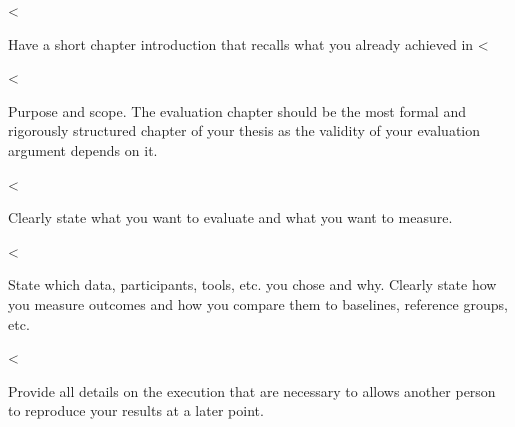 \documentclass[runningheads,a4paper,english]{llncs}[2018/03/10]
\begin{document}
{%
<%

Have a short chapter introduction that recalls what you already achieved in <%

<%

\textsf{Purpose and scope}. The evaluation chapter should be the most formal and rigorously structured chapter of your thesis as the validity of your evaluation argument depends on it.

<%

Clearly state what you want to evaluate and what you want to measure.

<%

State which data, participants, tools, etc. you chose and why. Clearly state how you measure outcomes and how you compare them to baselines, reference groups, etc.

<%

Provide all details on the execution that are necessary to allows another person to reproduce your results at a later point.

}
\end{document}

